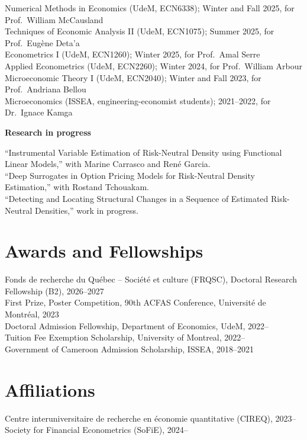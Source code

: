 \documentclass[11pt,letterpaper]{article}
\newenvironment{block}{\begin{list}{}{\setlength{\leftmargin}{1.6em}\setlength{\topsep}{0pt}%
  \setlength{\partopsep}{0pt}\setlength{\itemsep}{0pt}\setlength{\parsep}{0pt}}\item[]}{\end{list}}
\newcommand{\entry}[2]{\textbf{#1}\hfill\textit{#2}\par}
\newcommand{\gap}{\par\vspace{0.6em}}
\begin{document}
\begin{block}
Numerical Methods in Economics (UdeM, ECN6338); Winter and Fall 2025, for Prof.\ William McCausland\\
Techniques of Economic Analysis II (UdeM, ECN1075); Summer 2025, for Prof.\ Eugène Deta'a\\
Econometrics I (UdeM, ECN1260); Winter 2025, for Prof.\ Amal Serre\\
Applied Econometrics (UdeM, ECN2260); Winter 2024, for Prof.\ William Arbour\\
Microeconomic Theory I (UdeM, ECN2040); Winter and Fall 2023, for Prof.\ Andriana Bellou\\
Microeconomics (ISSEA, engineering-economist students); 2021--2022, for Dr.\ Ignace Kamga
\gap
\entry{Research in progress}{}
``Instrumental Variable Estimation of Risk-Neutral Density using Functional Linear Models,''
with Marine Carrasco and René Garcia.\\
``Deep Surrogates in Option Pricing Models for Risk-Neutral Density Estimation,'' with Rostand Tchouakam.\\
``Detecting and Locating Structural Changes in a Sequence of Estimated Risk-Neutral Densities,''
work in progress.
\end{block}

\section*{Awards and Fellowships}
\begin{block}
Fonds de recherche du Québec -- Société et culture (FRQSC), Doctoral Research Fellowship (B2), 2026--2027\\
First Prize, Poster Competition, 90th ACFAS Conference, Université de Montréal, 2023\\
Doctoral Admission Fellowship, Department of Economics, UdeM, 2022--\\
Tuition Fee Exemption Scholarship, University of Montreal, 2022--\\
Government of Cameroon Admission Scholarship, ISSEA, 2018--2021
\end{block}

\section*{Affiliations}
\begin{block}
Centre interuniversitaire de recherche en économie quantitative (CIREQ), 2023--\\
Society for Financial Econometrics (SoFiE), 2024--
\end{block}
\end{document}
